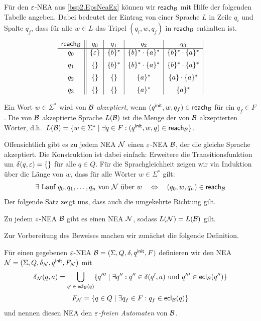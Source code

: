 Für den $\varepsilon$-NEA aus \autoref{bsp2.EpsNeaEx} können wir $\textsf{reach}_{\mathcal{B}}$ mit Hilfe der folgenden Tabelle angeben.
Dabei bedeutet der Eintrag von einer Sprache $L$ in Zeile $q_i$ und Spalte $q_j$, dass für alle $w\in L$ das Tripel
$(q_i,w,q_j)$ in $\textsf{reach}_{\mathcal{B}}$ enthalten ist.
\[
\begin{array}{c||c|c|c|c|c|c}
   \textsf{reach}_{\mathcal{B}}  & q_0 & q_1 & q_2 & q_3\\ \hline
q_0 & \{\varepsilon\} & \{b\}^* & \{b\}^*\cdot\{a\}^* & \{b\}^*\cdot\{a\}^* \\[2mm]
q_1 & \{\}     & \{b\}^* & \{b\}^*\cdot\{a\}^* & \{b\}^*\cdot\{a\}^* \\[2mm]
q_2 & \{\}     & \{\}    & \{a\}^*             & \{a\}\cdot\{a\}^*\\[2mm]
q_3 & \{\}     & \{\}    & \{a\}^*             & \{a\}^*
\end{array}
\]

\begin{Def}\label{def:2.EpsNeaSprache}
 Ein Wort $w\in\Sigma^*$ wird von $\mathcal{B}$ \emph{akzeptiert}, wenn $(q^\mathsf{init},w,q_f)\in\textsf{reach}_{\mathcal{B}}$ für ein $q_f\in F$.
 Die von $\mathcal{B}$ akzeptierte Sprache $L(\mathcal{B})$ ist die Menge der von $\mathcal{B}$ akzeptierten Wörter, d.h.\
	$L(\mathcal{B})=\{ w\in\Sigma^* \mid \exists q\in F: (q^\mathsf{init}, w, q)\in\textsf{reach}_{\mathcal{B}} \}$.
\end{Def}

Offensichtlich gibt es zu jedem \ac{NEA} $\mathcal{N}$ einen $\varepsilon$-NEA $\mathcal{B}$, der die gleiche Sprache akzeptiert.
Die Konstruktion ist dabei einfach: Erweitere die Transitionsfunktion um $\delta(q,\varepsilon)=\{\}$ für alle $q\in Q$.
Für die Sprachgleichheit zeigen wir via Induktion über die Länge von $w$, dass für alle Wörter $w \in \Sigma^*$ gilt:
$$\exists \text{ Lauf } q_0,q_1,\ldots, q_n \text{ von $\mathcal{N}$ über } w \quad\Leftrightarrow\quad (q_0,w,q_n)\in\textsf{reach}_{\mathcal{B}}$$
Der folgende Satz zeigt uns, dass auch die umgekehrte Richtung gilt.

\begin{Satz}\label{satz:2.EpsElim}
    Zu jedem $\varepsilon$-NEA $\mathcal{B}$ gibt es einen \ac{NEA} $\mathcal{N}$, sodass $L(\mathcal{N})=L(\mathcal{B})$ gilt.
\end{Satz}
Zur Vorbereitung des Beweises machen wir zunächst die folgende Definition.

\begin{Def}
 Für einen gegebenen $\varepsilon$-NEA $\mathcal{B}= (\Sigma, Q,\delta,q^\mathsf{init},F)$ definieren wir den \acs*{NEA} $\mathcal{N}= (\Sigma, Q,\delta_{\mathcal{N}},q^\mathsf{init},F_{\mathcal{N}})$ mit
        $$\delta_{\mathcal{N}}(q,a)=\bigcup\limits_{q'\,\in\,\textsf{ecl}_{\mathcal{B}}(q)}\{q'''\mid \exists q'' : q''\in\delta(q',a) \text{ und } q'''\in\textsf{ecl}_{\mathcal{B}}(q'')\}$$
        $$F_{\mathcal{N}}=\{q\in Q\mid \exists q_f\in F: q_f\in\textsf{ecl}_{\mathcal{B}}(q)\}$$
und nennen diesen \ac{NEA} den \emph{$\varepsilon$-freien Automaten} von $\mathcal{B}$.
\end{Def}

